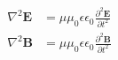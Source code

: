 \[
\begin{aligned}
\nabla^2 \boldsymbol{E} &= \mu \mu_0 \epsilon \epsilon_0 \frac{\partial^2 \boldsymbol{E}}{\partial t^2} \\
\nabla^2 \boldsymbol{B} &= \mu \mu_0 \epsilon \epsilon_0 \frac{\partial^2 \boldsymbol{B}}{\partial t^2}
\end{aligned}
\]
